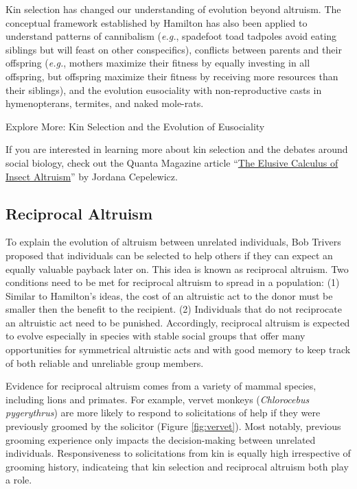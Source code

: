 \documentclass[
]{book}
\begin{document}
Kin selection has changed our understanding of evolution beyond altruism. The conceptual framework established by Hamilton has also been applied to understand patterns of cannibalism (\emph{e.g.}, spadefoot toad tadpoles avoid eating siblings but will feast on other conspecifics), conflicts between parents and their offspring (\emph{e.g.}, mothers maximize their fitness by equally investing in all offspring, but offspring maximize their fitness by receiving more resources than their siblings), and the evolution eusociality with non-reproductive casts in hymenopterans, termites, and naked mole-rats.

Explore More: Kin Selection and the Evolution of Eusociality

If you are interested in learning more about kin selection and the debates around social biology, check out the Quanta Magazine article ``\href{https://www.scientificamerican.com/article/the-elusive-calculus-of-insect-altruism/}{The Elusive Calculus of Insect Altruism}'' by Jordana Cepelewicz.

\hypertarget{reciprocal-altruism}{%
\subsection{Reciprocal Altruism}\label{reciprocal-altruism}}

To explain the evolution of altruism between unrelated individuals, Bob Trivers proposed that individuals can be selected to help others if they can expect an equally valuable payback later on. This idea is known as reciprocal altruism. Two conditions need to be met for reciprocal altruism to spread in a population: (1) Similar to Hamilton's ideas, the cost of an altruistic act to the donor must be smaller then the benefit to the recipient. (2) Individuals that do not reciprocate an altruistic act need to be punished. Accordingly, reciprocal altruism is expected to evolve especially in species with stable social groups that offer many opportunities for symmetrical altruistic acts and with good memory to keep track of both reliable and unreliable group members.

Evidence for reciprocal altruism comes from a variety of mammal species, including lions and primates. For example, vervet monkeys (\emph{Chlorocebus pygerythrus}) are more likely to respond to solicitations of help if they were previously groomed by the solicitor (Figure \ref{fig:vervet}). Most notably, previous grooming experience only impacts the decision-making between unrelated individuals. Responsiveness to solicitations from kin is equally high irrespective of grooming history, indicateing that kin selection and reciprocal altruism both play a role.
\end{document}
